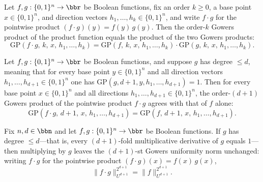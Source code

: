 \begin{lemma}
\label{LowDegreeTest.gowers_product_mul}
\leanok
{}
Let $f, g : \{0,1\}^n \to \bbr$ be Boolean functions, fix an order $k \ge 0$, a base
point $x \in \{0,1\}^n$, and direction vectors $h_1, \ldots, h_k \in \{0,1\}^n$, and
write $f \cdot g$ for the pointwise product $(f \cdot g)(y) = f(y)\,g(y)$. Then the
order-$k$ Gowers product of the product function equals the product of the two Gowers
products:
\[
  \mathrm{GP}(f \cdot g,\, k,\, x,\, h_1, \ldots, h_k)
  = \mathrm{GP}(f,\, k,\, x,\, h_1, \ldots, h_k)
    \cdot \mathrm{GP}(g,\, k,\, x,\, h_1, \ldots, h_k).
\]
\end{lemma}

\begin{lemma}
\label{LowDegreeTest.gowers_product_mul_degree_le}
\leanok
{}
Let $f, g : \{0,1\}^n \to \bbr$ be Boolean functions, and suppose $g$ has degree $\le
d$, meaning that for every base point $y \in \{0,1\}^n$ and all direction vectors
$h_1,\ldots,h_{d+1} \in \{0,1\}^n$ one has $\mathrm{GP}(g, d{+}1, y, h_1,\ldots,h_{d+1})
= 1$. Then for every base point $x \in \{0,1\}^n$ and all directions $h_1,\ldots,h_{d+1}
\in \{0,1\}^n$, the order-$(d{+}1)$ Gowers product of the pointwise product $f \cdot g$
agrees with that of $f$ alone:
\[
  \mathrm{GP}(f \cdot g,\, d{+}1,\, x,\, h_1,\ldots,h_{d+1})
  = \mathrm{GP}(f,\, d{+}1,\, x,\, h_1,\ldots,h_{d+1}).
\]
\end{lemma}

\begin{lemma}
\label{LowDegreeTest.gowers_norm_mul_degree_le}
\leanok
{}
Fix $n, d \in \bbn$ and let $f, g : \{0,1\}^n \to \bbr$ be Boolean functions. If $g$ has
degree $\le d$—that is, every $(d{+}1)$-fold multiplicative derivative of $g$ equals
$1$—then multiplying by $g$ leaves the $(d{+}1)$-st Gowers uniformity norm unchanged:
writing $f \cdot g$ for the pointwise product $(f \cdot g)(x) = f(x)\,g(x)$,
\[
  \|f \cdot g\|_{U^{d+1}}^{2^{d+1}} = \|f\|_{U^{d+1}}^{2^{d+1}}.
\]
\end{lemma}

